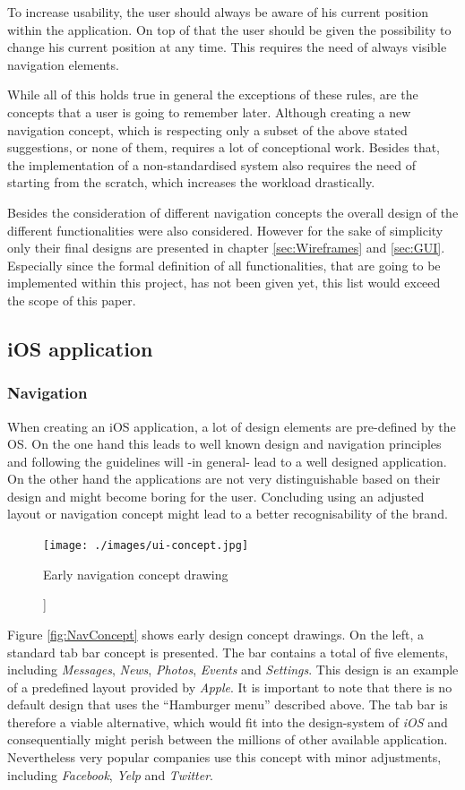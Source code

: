To increase usability, the user should always be aware of his current position within the application. On top of that the user should be given the possibility to change his current position at any time. This requires the need of always visible navigation elements. 

While all of this holds true in general the exceptions of these rules, are the concepts that a user is going to remember later. Although creating a new navigation concept, which is respecting only a subset of the above stated suggestions, or none of them, requires a lot of conceptional work. Besides that, the implementation of a non-standardised system also requires the need of starting from the scratch, which increases the workload drastically. \cite{Hampton-Smith:2013aa}

Besides the consideration of different navigation concepts the overall design of the different functionalities were also considered. However for the sake of simplicity only their final designs are presented in chapter \vref{sec:Wireframes} and \vref{sec:GUI}. Especially since the formal definition of all functionalities, that are going to be implemented within this project, has not been given yet, this list would exceed the scope of this paper.

\subsection{iOS application}
\subsubsection{Navigation}
When creating an iOS application, a lot of design elements are pre-defined by the \acrlong{OS}. On the one hand this leads to well known design and navigation principles and following the guidelines will -in general- lead to a well designed application. On the other hand the applications are not very distinguishable based on their design and might become boring for the user. Concluding using an adjusted layout or navigation concept might lead to a better recognisability of the brand. 

\begin{figure}[h]
  	\centering
  	\texttt{[image: ./images/ui-concept.jpg]}
  	\caption[Early navigation concept drawing [own figure]]{Early navigation concept drawing}
	\label{fig:NavConcept}
\end{figure}

Figure \vref{fig:NavConcept} shows early design concept drawings. On the left, a standard tab bar concept is presented. The bar contains a total of five elements, including \emph{Messages}, \emph{News}, \emph{Photos}, \emph{Events} and \emph{Settings}. This design is an example of a predefined layout provided by \emph{Apple}. It is important to note that there is no default design that uses the \enquote{Hamburger menu} described above. The tab bar is therefore a viable alternative, which would fit into the design-system of \emph{iOS} and consequentially might perish between the millions of other available application. Nevertheless very popular companies use this concept with minor adjustments, including \emph{Facebook}, \emph{Yelp} and \emph{Twitter}.

